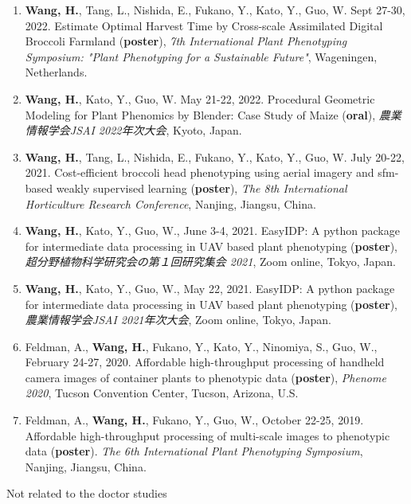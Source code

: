 \begin{singlespace}
\begin{enumerate}
  \item \textbf{Wang, H.}, Tang, L., Nishida, E., Fukano, Y., Kato, Y., Guo, W. Sept 27-30, 2022. Estimate Optimal Harvest Time by Cross-scale Assimilated Digital Broccoli Farmland (\textbf{poster}), \textit{7th International Plant Phenotyping Symposium: "Plant Phenotyping for a Sustainable Future"}, Wageningen, Netherlands.
  \item \textbf{Wang, H.}, Kato, Y., Guo, W. May 21-22, 2022. Procedural Geometric Modeling for Plant Phenomics by Blender: Case Study of Maize (\textbf{oral}), \textit{農業情報学会JSAI 2022年次大会}, Kyoto, Japan.
  \item \textbf{Wang, H.}, Tang, L., Nishida, E., Fukano, Y., Kato, Y., Guo, W. July 20-22, 2021. Cost-efficient broccoli head phenotyping using aerial imagery and \gls{sfm}-based weakly supervised learning (\textbf{poster}), \textit{The 8th International Horticulture Research Conference}, Nanjing, Jiangsu, China.
  \item \textbf{Wang, H.}, Kato, Y., Guo, W., June 3-4, 2021. EasyIDP: A python package for intermediate data processing in UAV based plant phenotyping (\textbf{poster}), \textit{超分野植物科学研究会の第１回研究集会 2021}, Zoom online, Tokyo, Japan.
  \item \textbf{Wang, H.}, Kato, Y., Guo, W., May 22, 2021. EasyIDP: A python package for intermediate data processing in UAV based plant phenotyping (\textbf{poster}), \textit{農業情報学会JSAI 2021年次大会}, Zoom online, Tokyo, Japan.
  \item Feldman, A., \textbf{Wang, H.}, Fukano, Y., Kato, Y., Ninomiya, S., Guo, W., February 24-27, 2020. Affordable high-throughput processing of handheld camera images of container plants to phenotypic data (\textbf{poster}), \textit{Phenome 2020}, Tucson Convention Center, Tucson, Arizona, U.S.
  \item Feldman, A., \textbf{Wang, H.}, Fukano, Y., Guo, W., October 22-25, 2019. Affordable high-throughput processing of multi-scale images to phenotypic data (\textbf{poster}). \textit{The 6th International Plant Phenotyping Symposium}, Nanjing, Jiangsu, China.
\end{enumerate}

\noindent
Not related to the doctor studies


\end{singlespace}
